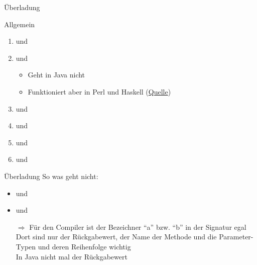 \documentclass[usepdftitle=false,hyperref={pdfpagelabels=false}]{beamer}
\begin{document}
\begin{frame}{Überladung}
    \begin{exampleblock}{Allgemein}
        \begin{enumerate}[<+->]
            \item {} und 
            \item {} und 
            \begin{itemize}
                \item Geht in Java nicht
                \item Funktioniert aber in Perl und Haskell (\href{http://stackoverflow.com/a/442291/562769}{Quelle})
            \end{itemize}
            \item {} und 
            \item {} und 
            \item {} und 
            \item {} und 
        \end{enumerate}
    \end{exampleblock}
\end{frame}

\begin{frame}{Überladung}
    So was geht nicht:
    \begin{itemize}[<+->]
        \item {} und 
        \item {} und 
        \item[$\Rightarrow$] Für den Compiler ist der Bezeichner "`a"' bzw. "`b"' in der Signatur egal\\
              Dort sind nur der Rückgabewert, der Name der Methode und die Parameter-Typen und deren Reihenfolge wichtig\\
              In Java nicht mal der Rückgabewert
    \end{itemize}
\end{frame}
\end{document}
